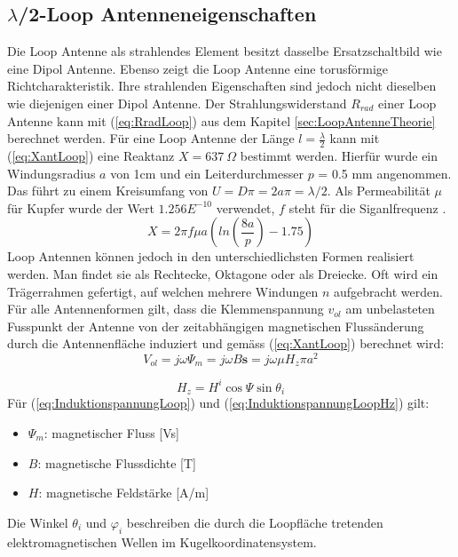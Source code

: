 \subsection{$\lambda$/2-Loop Antenneneigenschaften}
Die Loop Antenne als strahlendes Element besitzt dasselbe Ersatzschaltbild wie eine Dipol Antenne. Ebenso zeigt die Loop Antenne eine torusförmige Richtcharakteristik. Ihre strahlenden Eigenschaften sind jedoch nicht dieselben wie diejenigen einer Dipol Antenne. Der Strahlungswiderstand $R_{rad}$ einer Loop Antenne kann mit (\ref{eq:RradLoop}) aus dem Kapitel \ref{sec:LoopAntenneTheorie} berechnet werden. Für eine Loop Antenne der Länge $l=\frac{\lambda}{2}$ kann mit (\ref{eq:XantLoop}) eine Reaktanz $X = 637 \ \Omega$ bestimmt werden. Hierfür wurde ein Windungsradius $a$ von 1cm und ein Leiterdurchmesser $p$ = 0.5 mm angenommen. Das führt zu einem Kreisumfang von $U=D\pi=2a\pi=\lambda /2$. Als Permeabilität $\mu $ für Kupfer wurde der Wert $1.256E^{-10}$ verwendet, $f$ steht für die Siganlfrequenz \cite{Antenne_Theory_Xant_Loop}.
\begin{equation}\label{eq:XantLoop}
X= 2\pi f\mu a(ln \left( \frac{8a}{p} \right)-1.75)
\end{equation}
Loop Antennen können jedoch in den unterschiedlichsten Formen realisiert werden. Man findet sie als Rechtecke, Oktagone oder als Dreiecke. Oft wird ein Trägerrahmen gefertigt, auf welchen mehrere Windungen $n$ aufgebracht werden. Für alle Antennenformen gilt, dass die Klemmenspannung $v_{ol}$ am unbelasteten Fusspunkt der Antenne von der zeitabhängigen magnetischen Flussänderung durch die Antennenfläche induziert und gemäss (\ref{eq:XantLoop}) berechnet wird:
\begin{equation}\label{eq:InduktionspannungLoop}
V_{ol}= j\omega\Psi_{m}=j\omega B\textbf{s}= j\omega\mu H_{z}\pi a^{2}
\end{equation}

\begin{equation}\label{eq:InduktionspannungLoopHz}
H_{z}=H^{i}\cos\Psi\sin\theta_{i}
\end{equation}
Für (\ref{eq:InduktionspannungLoop}) und (\ref{eq:InduktionspannungLoopHz}) gilt: \\

\begin{itemize}
\item $\Psi_{m}$: magnetischer Fluss [Vs]
\item $B$: magnetische Flussdichte [T]
\item $H$: magnetische Feldstärke [A/m]
\end{itemize}
Die Winkel $\theta_{i}$ und $\varphi_{i}$ beschreiben die durch die Loopfläche tretenden elektromagnetischen Wellen im  Kugelkoordinatensystem.

